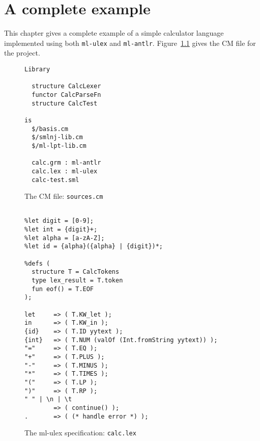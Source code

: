 %
\chapter{A complete example}
\label{ch:example}

This chapter gives a complete example of a simple calculator
language implemented using both \texttt{ml-ulex} and \texttt{ml-antlr}.
Figure~\ref{fig:calc-sources} gives the CM file for the project.
\begin{figure}[h]
\begin{lstlisting}[language=CM]
Library

  structure CalcLexer
  functor CalcParseFn
  structure CalcTest

is
  $/basis.cm
  $/smlnj-lib.cm
  $/ml-lpt-lib.cm

  calc.grm : ml-antlr
  calc.lex : ml-ulex
  calc-test.sml
\end{lstlisting}%
\caption{The CM file: {\tt sources.cm}}
\label{fig:calc-sources}
\end{figure}%

\begin{figure}

\begin{lstlisting}[language=MLULex]
%name CalcLexer;

%let digit = [0-9];
%let int = {digit}+;
%let alpha = [a-zA-Z];
%let id = {alpha}({alpha} | {digit})*;

%defs (
  structure T = CalcTokens
  type lex_result = T.token
  fun eof() = T.EOF
);

let     => ( T.KW_let );
in      => ( T.KW_in );
{id}    => ( T.ID yytext );
{int}   => ( T.NUM (valOf (Int.fromString yytext)) );
"="     => ( T.EQ );
"+"     => ( T.PLUS );
"-"     => ( T.MINUS );
"*"     => ( T.TIMES );
"("     => ( T.LP );
")"     => ( T.RP );
" " | \n | \t
        => ( continue() );
.       => ( (* handle error *) );
\end{lstlisting}
\caption{The ml-ulex specification: \texttt{calc.lex}}
\label{fig:calc-lex}
\end{figure}%

